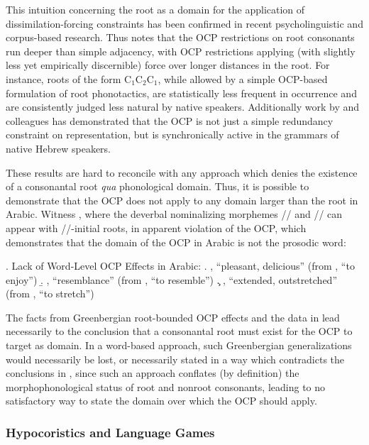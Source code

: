 \documentclass[12pt,twoside,letterpaper]{article}
\begin{document}
This intuition concerning the root as a domain for the application of dissimilation-forcing constraints has been confirmed in recent psycholinguistic and corpus-based research. Thus \cite{pierrehumbert93} notes that the OCP restrictions on root consonants run deeper than simple adjacency, with OCP restrictions applying (with slightly less yet empirically discernible) force over longer distances in the root. For instance, roots of the form C$_1$C$_2$C$_1$, while allowed by a simple OCP-based formulation of root phonotactics, are statistically less frequent in occurrence and are consistently judged less natural by native speakers. Additionally work by \cite{berent01} and colleagues has demonstrated that the OCP is not just a simple redundancy constraint on representation, but is synchronically active in the grammars of native Hebrew speakers.

These results are hard to reconcile with any approach which denies the existence of a consonantal root \emph{qua} phonological domain. Thus, it is possible to demonstrate that the OCP does not apply to any domain larger than the root in Arabic. Witness \Next, where the deverbal nominalizing morphemes // and // can appear with //-initial roots, in apparent violation of the OCP, which demonstrates that the domain of the OCP in Arabic is not the prosodic word:

\pagebreak

\ex. Lack of Word-Level OCP Effects in Arabic:
\a. , ``pleasant, delicious'' (from {\em {}}, ``to enjoy'')
\b. , ``resemblance'' (from {\em {}}, ``to resemble'')
\c. , ``extended, outstretched'' (from {\em {}}, ``to stretch'')

The facts from Greenbergian root-bounded OCP effects and the data in \Last lead necessarily to the conclusion that a consonantal root must exist for the OCP to target as domain. In a word-based approach, such Greenbergian generalizations would necessarily be lost, or necessarily stated in a way which contradicts the conclusions in \Last, since such an approach conflates (by definition) the morphophonological status of root and nonroot consonants, leading to no satisfactory way to state the domain over which the OCP should apply.

\subsubsection{Hypocoristics and Language Games}
\label{sec:hypoc-lang-games}
\end{document}
